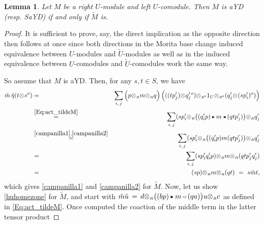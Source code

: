 \documentclass[reqno, a4paper, 10pt]{amsart}
\numberwithin{equation}{section}
\theoremstyle{plain}
\newtheorem{lemma}[theorem]{Lemma}
\theoremstyle{definition}
\theoremstyle{remark}
\begin{document}
\begin{lemma}
\label{Lemma:I}
Let $M$ be a right $U$-module and left $U$-comodule. Then $M$ is aYD (resp. SaYD)
if and only if $\tilde{M}$ is.
\end{lemma}
\begin{proof}
It is sufficient to prove, say, the direct implication as the opposite direction then follows at once since both directions in the Morita base change induced equivalence between $U$-modules and ${\tilde{{U}}}$-modules as well as in the induced equivalence between $U$-comodules and ${\tilde{{U}}}$-comodules work the same way. 

So assume that $M$ is aYD.
Then, for any $s, t \in S$, we have 
\begin{eqnarray*}
 {\tilde{{m}}}\, {\tilde{{\eta}}}( t{\otimes_{\scriptscriptstyle{{}}}}s^o) &=& \sum_{i,\, j}
 \Big(p{\otimes_{\scriptscriptstyle{{R}}}}m{\otimes_{\scriptscriptstyle{{R}}}}q \Big) \, \Big( ((t p'_j){\otimes_{\scriptscriptstyle{{}}}}q'_j{}^o) {\otimes_{\scriptscriptstyle{{\scriptscriptstyle{{R^{\rm e}}}}}}}1_{U}
{\otimes_{\scriptscriptstyle{{\scriptscriptstyle{{R^{\rm e}}}}}}} (q_j'{\otimes_{\scriptscriptstyle{{}}}}(sp_i')^o) \Big) \\ &\overset{\eqref{Eq:act_tildeM}}{=}& 
\sum_{i,\,j} (sp_i'{\otimes_{\scriptscriptstyle{{R}}}}{\big( {(q_i'p){{\,\raise1pt\hbox{$\scriptscriptstyle{\blacktriangleright}$} \, }} m{{\,\raise1pt\hbox{$\scriptscriptstyle{\blacktriangleleft}$} \, }} (qtp_j')} \big)}{\otimes_{\scriptscriptstyle{{R}}}} q_j' 
\\ &\overset{{\eqref{campanilla1},\eqref{campanilla2}}}{=}&  \sum_{i,\,j} (sp_i'{\otimes_{\scriptscriptstyle{{R}}}}{\big( {(q_i'p) m (qtp_j')} \big)}{\otimes_{\scriptscriptstyle{{R}}}} q_j' \\ &=& \sum_{i,\,j} (sp_i'q_i'p){\otimes_{\scriptscriptstyle{{R}}}}m{\otimes_{\scriptscriptstyle{{R}}}}(qtp_j'q_j') \\ &=& (sp){\otimes_{\scriptscriptstyle{{R}}}}m{\otimes_{\scriptscriptstyle{{R}}}}(qt) \,\, =\,\, s{\tilde{{m}}}t,
\end{eqnarray*}
which gives \eqref{campanilla1} and \eqref{campanilla2} for ${\tilde{{M}}}$. 
Now, let us show  \eqref{huhomezone} for ${\tilde{{M}}}$, and
start with ${\tilde{{m}}}{\tilde{{u}}}\,=\, d{\otimes_{\scriptscriptstyle{{R}}}}\big((bp){{\,\raise1pt\hbox{$\scriptscriptstyle{\blacktriangleright}$} \, }} m {{\,\raise1pt\hbox{$\scriptscriptstyle{\lhd}$} \, }}(qa)\big)u{\otimes_{\scriptscriptstyle{{R}}}} c$ as defined in \eqref{Eq:act_tildeM}. 
Once computed the coaction of the middle term in the latter tensor product 

\end{proof}
\end{document}

